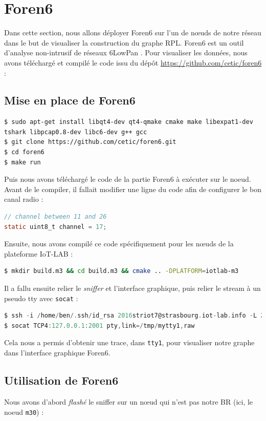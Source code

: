 \documentclass[	DIV=calc,%
							paper=a4,%
							fontsize=11pt,%
			  ]{scrartcl}	 					%
\begin{document}
\section{Foren6}
Dans cette section, nous allons déployer Foren6 sur l'un de nœuds de notre réseau dans le but de visualiser la construction du graphe RPL. Foren6 est un outil d'analyse non-intrusif de réseaux 6LowPan .
Pour visualiser les données, nous avons téléchargé et compilé le code issu du dépôt \url{https://github.com/cetic/foren6} :
\subsection{Mise en place de Foren6}
\begin{lstlisting}
$ sudo apt-get install libqt4-dev qt4-qmake cmake make libexpat1-dev tshark libpcap0.8-dev libc6-dev g++ gcc
$ git clone https://github.com/cetic/foren6.git
$ cd foren6
$ make run
\end{lstlisting}

Puis nous avons téléchargé le code de la partie Foren6 à exécuter sur le noeud. Avant de le compiler, il fallait modifier une ligne du code afin de configurer le bon canal radio :
\begin{lstlisting}[language=C]
// channel between 11 and 26
static uint8_t channel = 17;
\end{lstlisting}
Ensuite, nous avons compilé ce code spécifiquement pour les nœuds de la plateforme IoT-LAB :
\begin{lstlisting}[language=bash]
$ mkdir build.m3 && cd build.m3 && cmake .. -DPLATFORM=iotlab-m3
\end{lstlisting}

Il a fallu ensuite relier le \textit{sniffer} et l'interface graphique, puis relier le stream à un pseudo tty avec \texttt{socat} :

\begin{lstlisting}[language=C]
$ ssh -i /home/ben/.ssh/id_rsa 2016striot7@strasbourg.iot-lab.info -L 2001:m3-34:20000
$ socat TCP4:127.0.0.1:2001 pty,link=/tmp/mytty1,raw
\end{lstlisting}

Cela nous a permis d'obtenir une trace, dans \texttt{tty1}, pour visualiser notre graphe dans l'interface graphique Foren6.

\subsection{Utilisation de Foren6}
Nous avons d'abord \textit{flashé} le sniffer sur un nœud qui n'est pas notre BR (ici, le noeud \texttt{m30}) :
\end{document}
